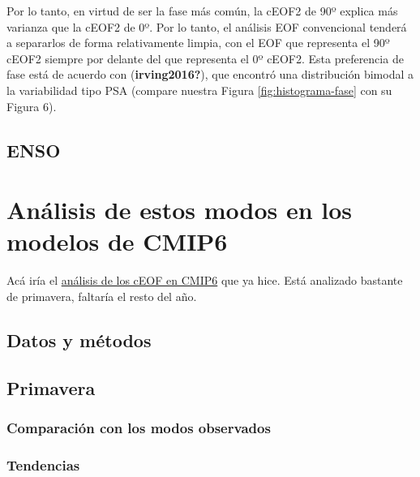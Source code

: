 \documentclass[12pt,oneside]{reedthesis}
\begin{document}
Por lo tanto, en virtud de ser la fase más común, la cEOF2 de 90º explica más varianza que la cEOF2 de 0º.
Por lo tanto, el análisis EOF convencional tenderá a separarlos de forma relativamente limpia, con el EOF que representa el 90º cEOF2 siempre por delante del que representa el 0º cEOF2.
Esta preferencia de fase está de acuerdo con (\textbf{irving2016?}), que encontró una distribución bimodal a la variabilidad tipo PSA (compare nuestra Figura \ref{fig:histograma-fase} con su Figura 6).

\hypertarget{enso}{%
\section{ENSO}\label{enso}}

\hypertarget{anuxe1lisis-de-estos-modos-en-los-modelos-de-cmip6}{%
\chapter{Análisis de estos modos en los modelos de CMIP6}\label{anuxe1lisis-de-estos-modos-en-los-modelos-de-cmip6}}

Acá iría el \href{https://htmlpreview.github.io/?https://github.com/eliocamp/onda3/blob/master/35-cEOF-CMIP6-superensemble-SON.html}{análisis de los cEOF en CMIP6} que ya hice. Está analizado bastante de primavera, faltaría el resto del año.

\hypertarget{datos-y-muxe9todos-3}{%
\section{Datos y métodos}\label{datos-y-muxe9todos-3}}

\hypertarget{primavera-1}{%
\section{Primavera}\label{primavera-1}}

\hypertarget{comparaciuxf3n-con-los-modos-observados}{%
\subsection{Comparación con los modos observados}\label{comparaciuxf3n-con-los-modos-observados}}

\hypertarget{tendencias}{%
\subsection{Tendencias}\label{tendencias}}
\end{document}

